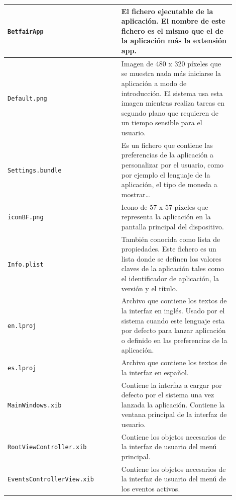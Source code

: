\begin{center}
\begin{supertabular}{||p{0.45\linewidth}|p{0.45\linewidth}||}
\lstinline!BetfairApp! & El fichero ejecutable de la aplicación. El nombre de este fichero es el mismo que el de la aplicación más la extensión app.\\ 
\hline 
\lstinline!Default.png! & Imagen de 480 x 320 píxeles que se muestra nada más iniciarse la aplicación  a modo de introducción. El sistema usa esta imagen mientras realiza tareas en segundo plano que requieren de un tiempo sensible para el usuario.\\
\hline
\lstinline!Settings.bundle! & Es un fichero que contiene las preferencias de la aplicación a personalizar por el usuario, como por ejemplo el lenguaje de la aplicación, el tipo de moneda a mostrar\ldots \\
\hline
\lstinline!iconBF.png! & Icono de 57 x 57 píxeles que representa la aplicación en la pantalla principal del dispositivo. \\
\hline
\lstinline!Info.plist! & También conocida como lista de propiedades. Este fichero es un lista donde se definen los valores claves de la aplicación tales como el identificador de aplicación, la versión y el título.\\
\hline
\lstinline!en.lproj! & Archivo que contiene los textos de la interfaz en inglés. Usado por el sistema cuando este lenguaje esta por defecto para lanzar aplicación o definido en las preferencias de la aplicación.\\
\hline
\lstinline!es.lproj! &Archivo que contiene los textos de la interfaz en español.\\
\hline
\lstinline!MainWindows.xib! & Contiene la interfaz a cargar por defecto por el sistema una vez lanzada la aplicación. Contiene la ventana principal de la interfaz de usuario. \\
\hline
\lstinline!RootViewController.xib! & Contiene los objetos necesarios de la interfaz de usuario del menú principal. \\
\hline
\lstinline!EventsControllerView.xib! &Contiene los objetos necesarios de la interfaz de usuario del menú de los eventos activos. \\

\end{supertabular}
\end{center}
